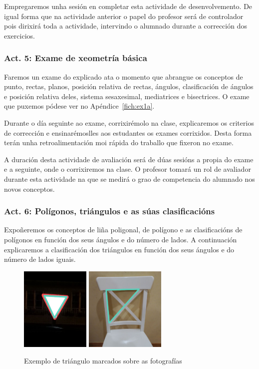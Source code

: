 Empregaremos unha sesión en completar esta actividade de desenvolvemento. De igual forma que na actividade anterior o papel do profesor será de controlador pois dirixirá toda a actividade, intervindo o alumnado durante a corrección dos exercicios.

\subsubsection{Act. 5: Exame de xeometría básica}\label{act:examen1}
Faremos un exame do explicado ata o momento que abrangue os conceptos de punto, rectas, planos, posición relativa de rectas, ángulos, clasificación de ángulos e posición relativa deles, sistema sesaxesimal, mediatrices e bisectrices. O exame que puxemos pódese ver no Apéndice~\ref{fich:ex1a}.

Durante o día seguinte ao exame, corrixirémolo na clase, explicaremos os criterios de corrección e ensinarémoslles aos estudantes os exames corrixidos. Desta forma terán unha retroalimentación moi rápida do traballo que fixeron no exame.

A duración desta actividade de avaliación será de dúas sesións a propia do exame e a seguinte, onde o corrixiremos na clase. O profesor tomará un rol de avaliador durante esta actividade na que se medirá o grao de competencia do alumnado nos novos conceptos.

\subsubsection{Act. 6: Polígonos, triángulos e as súas clasificacións}\label{act:clastriangulos}
Expoñeremos os conceptos de liña poligonal, de polígono e as clasificacións de polígonos en función dos seus ángulos e do número de lados. A continuación explicaremos a clasificación dos triángulos en función dos seus ángulos e do número de lados iguais.

\begin{figure}[h!]
  \centering
  \includegraphics[height=4cm]{img/trian1.jpg}
  \includegraphics[height=4cm]{img/trian2.jpg}
  \caption{Exemplo de triángulo marcados sobre as fotografías}\label{fig:act7}
\end{figure}

